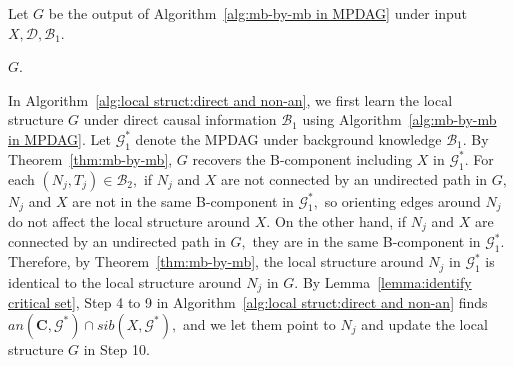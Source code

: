 \documentclass{article}
\begin{document}
\begin{algorithm}[t]
\LinesNumbered
\caption{Learning the local structure around $X$ given background knowledge consisting of direct causal information $\mathcal{B}_1$ and non-ancestral information $\mathcal{B}_2$.}
\label{alg:local struct:direct and non-an}
\small

Let $G$ be the output of Algorithm~\ref{alg:mb-by-mb in MPDAG} under input $X,\mathcal{D},\mathcal{B}_1$.

\Return $G$.

\end{algorithm}

In Algorithm~\ref{alg:local struct:direct and non-an}, we first learn the local structure $G$ under direct causal information $\mathcal{B}_1$ using Algorithm~\ref{alg:mb-by-mb in MPDAG}. Let $\mathcal{G}^*_1$ denote the MPDAG under background knowledge $\mathcal{B}_1.$ By Theorem~\ref{thm:mb-by-mb}, $G$ recovers the B-component including $X$ in $\mathcal{G}^*_1.$ For each $(N_j,T_j)\in \mathcal{B}_2,$ if $N_j$ and $X$ are not connected by an undirected path in $G,$ $N_j$ and $X$ are not in the same B-component in $\mathcal{G}^*_1,$ so orienting edges around $N_j$ do not affect the local structure around $X.$ On the other hand, if $N_j$ and $X$ are connected by an undirected path in $G,$ they are in the same B-component in $\mathcal{G}^*_1.$ Therefore, by Theorem~\ref{thm:mb-by-mb}, the local structure around $N_j$ in $\mathcal{G}^*_1$ is identical to the local structure around $N_j$ in $G.$ By Lemma~\ref{lemma:identify critical set}, Step 4 to 9 in Algorithm~\ref{alg:local struct:direct and non-an} finds $an(\mathbf{C},\mathcal{G}^*) \cap sib(X,\mathcal{G}^*),$ and we let them point to $N_j$ and update the local structure $G$ in Step 10. 
\end{document}
